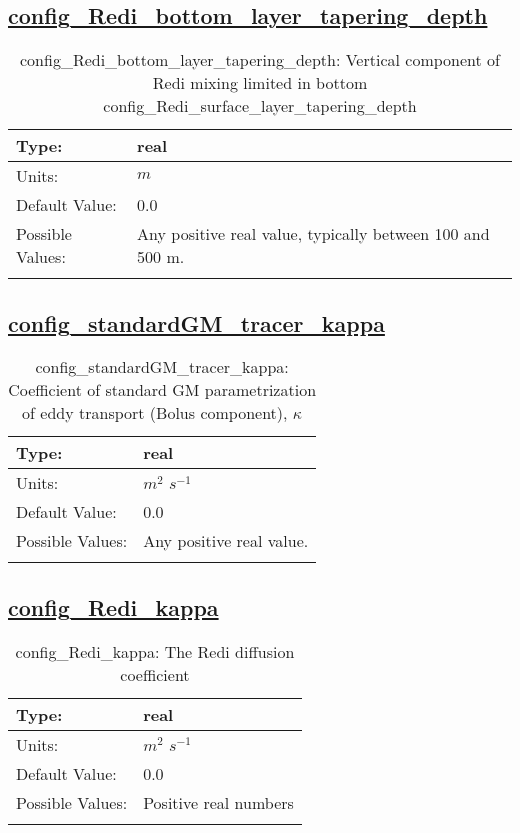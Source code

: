 \subsection[config\_Redi\_bottom\_layer\_tapering\_depth]{\hyperref[sec:nm_tab_mesoscale_eddy_parameterization]{config\_Redi\_bottom\_layer\_tapering\_depth}}
\label{subsec:nm_sec_config_Redi_bottom_layer_tapering_depth}
\begin{center}
\begin{longtable}{| p{2.0in} || p{4.0in} |}
    \hline
    Type: & real \\
    \hline
    Units: & $m$ \\
    \hline
    Default Value: & 0.0 \\
    \hline
    Possible Values: & Any positive real value, typically between 100 and 500 m. \\
    \hline
    \caption{config\_Redi\_bottom\_layer\_tapering\_depth: Vertical component of Redi mixing limited in bottom config\_Redi\_surface\_layer\_tapering\_depth}
\end{longtable}
\end{center}
\subsection[config\_standardGM\_tracer\_kappa]{\hyperref[sec:nm_tab_mesoscale_eddy_parameterization]{config\_standardGM\_tracer\_kappa}}
\label{subsec:nm_sec_config_standardGM_tracer_kappa}
\begin{center}
\begin{longtable}{| p{2.0in} || p{4.0in} |}
    \hline
    Type: & real \\
    \hline
    Units: & $m^2$ $s^{-1}$ \\
    \hline
    Default Value: & 0.0 \\
    \hline
    Possible Values: & Any positive real value. \\
    \hline
    \caption{config\_standardGM\_tracer\_kappa:  Coefficient of standard GM parametrization of eddy transport (Bolus component),  $\kappa$ }
\end{longtable}
\end{center}
\subsection[config\_Redi\_kappa]{\hyperref[sec:nm_tab_mesoscale_eddy_parameterization]{config\_Redi\_kappa}}
\label{subsec:nm_sec_config_Redi_kappa}
\begin{center}
\begin{longtable}{| p{2.0in} || p{4.0in} |}
    \hline
    Type: & real \\
    \hline
    Units: & $m^2$ $s^{-1}$ \\
    \hline
    Default Value: & 0.0 \\
    \hline
    Possible Values: & Positive real numbers \\
    \hline
    \caption{config\_Redi\_kappa: The Redi diffusion coefficient}
\end{longtable}
\end{center}

